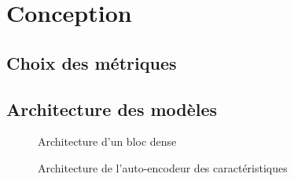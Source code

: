 \section{Conception}


\subsection{Choix des métriques}

\subsection{Architecture des modèles}

    \begin{figure}[H]
        \centering
        \caption{Architecture d'un bloc dense}
        \label{fig:architecture_bloc_dense}
    \end{figure}

    
    \begin{figure}[H]
        \centering
        \caption{Architecture de l'auto-encodeur des caractéristiques}
        \label{fig:architecture_autoencoder_caracteristique}
    \end{figure}

    